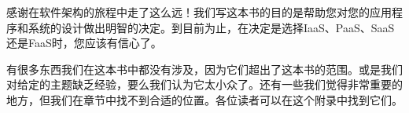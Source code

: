 感谢在软件架构的旅程中走了这么远！我们写这本书的目的是帮助您对您的应用程序和系统的设计做出明智的决定。到目前为止，在决定是选择IaaS、PaaS、SaaS还是FaaS时，您应该有信心了。

有很多东西我们在这本书中都没有涉及，因为它们超出了这本书的范围。或是我们对给定的主题缺乏经验，要么我们认为它太小众了。还有一些我们觉得非常重要的地方，但我们在章节中找不到合适的位置。各位读者可以在这个附录中找到它们。